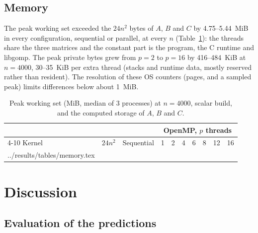 \documentclass[11pt,a4paper]{article}
\makeatletter
\newcommand{\tableinput}[1]{\@@input #1 }
\makeatother
\begin{document}
\subsection{Memory}

The peak working set exceeded the $24n^2$ bytes of $A$, $B$ and $C$ by 4.75--5.44~MiB in
every configuration, sequential or parallel, at every $n$ (Table~\ref{tab:memory}): the
threads share the three matrices and the constant part is the program, the C runtime and
libgomp. The peak private bytes grew from $p = 2$ to $p = 16$ by 416--484~KiB at
$n = 4000$, 30--35~KiB per extra thread (stacks and runtime data, mostly reserved rather
than resident). The resolution of these OS counters (pages, and a sampled peak) limits
differences below about 1~MiB.

\begin{table}[H]
\centering
\small
\setlength{\tabcolsep}{4.5pt}
\begin{tabular}{l r r rrrrrrr}
\toprule
& & & \multicolumn{7}{c}{OpenMP, $p$ threads} \\
\cmidrule(l){4-10}
Kernel & $24n^2$ & Sequential & 1 & 2 & 4 & 6 & 8 & 12 & 16 \\
\midrule
\tableinput{../results/tables/memory.tex}
\bottomrule
\end{tabular}
\caption{Peak working set (MiB, median of 3 processes) at $n = 4000$, scalar build, and the
computed storage of $A$, $B$ and $C$.}
\label{tab:memory}
\end{table}

\section{Discussion}

\subsection{Evaluation of the predictions}
\label{sec:hyp}
\end{document}
